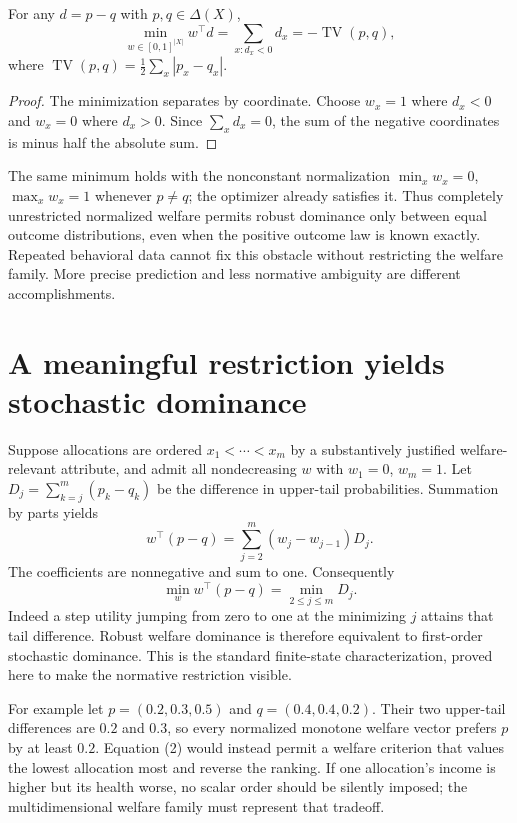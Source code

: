 \documentclass[11pt,a4paper]{article}
\DeclareMathOperator{\TV}{TV}
\begin{document}
For any $d=p-q$ with $p,q\in\Delta(X)$,
\[
 \min_{w\in[0,1]^{|X|}}w^\top d
 =\sum_{x:d_x<0}d_x=-\TV(p,q),
\tag{2}
\]
where $\TV(p,q)=\frac12\sum_x|p_x-q_x|$.
\begin{proof}
The minimization separates by coordinate. Choose $w_x=1$ where $d_x<0$ and $w_x=0$ where $d_x>0$. Since $\sum_xd_x=0$, the sum of the negative coordinates is minus half the absolute sum.
\end{proof}
The same minimum holds with the nonconstant normalization $\min_xw_x=0$, $\max_xw_x=1$ whenever $p\ne q$; the optimizer already satisfies it. Thus completely unrestricted normalized welfare permits robust dominance only between equal outcome distributions, even when the positive outcome law is known exactly. Repeated behavioral data cannot fix this obstacle without restricting the welfare family. More precise prediction and less normative ambiguity are different accomplishments.

\section{A meaningful restriction yields stochastic dominance}
Suppose allocations are ordered $x_1<\cdots<x_m$ by a substantively justified welfare-relevant attribute, and admit all nondecreasing $w$ with $w_1=0$, $w_m=1$. Let $D_j=\sum_{k=j}^m(p_k-q_k)$ be the difference in upper-tail probabilities. Summation by parts yields
\[
 w^\top(p-q)=\sum_{j=2}^m(w_j-w_{j-1})D_j.
\tag{3}
\]
The coefficients are nonnegative and sum to one. Consequently
\[
 \min_w w^\top(p-q)=\min_{2\le j\le m}D_j.
\]
Indeed a step utility jumping from zero to one at the minimizing $j$ attains that tail difference. Robust welfare dominance is therefore equivalent to first-order stochastic dominance. This is the standard finite-state characterization, proved here to make the normative restriction visible.

For example let $p=(0.2,0.3,0.5)$ and $q=(0.4,0.4,0.2)$. Their two upper-tail differences are $0.2$ and $0.3$, so every normalized monotone welfare vector prefers $p$ by at least $0.2$. Equation (2) would instead permit a welfare criterion that values the lowest allocation most and reverse the ranking. If one allocation's income is higher but its health worse, no scalar order should be silently imposed; the multidimensional welfare family must represent that tradeoff.
\end{document}
